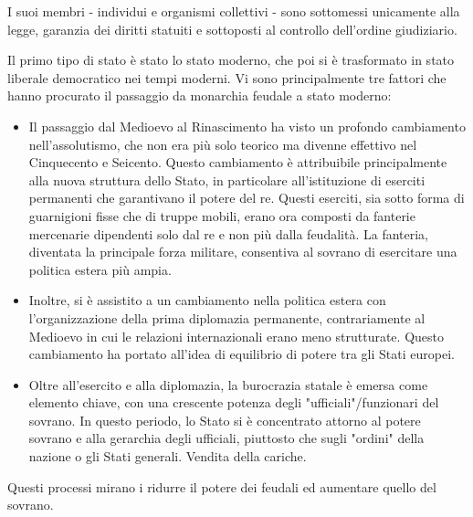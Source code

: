 \documentclass[a4paper]{article}
\begin{document}

I suoi membri - individui e organismi collettivi - sono sottomessi unicamente alla legge,
garanzia dei diritti statuiti e sottoposti al controllo dell'ordine giudiziario.

Il primo tipo di stato è stato lo stato moderno, che poi si è trasformato in stato liberale democratico
nei tempi moderni.
Vi sono principalmente tre fattori che hanno procurato il passaggio da monarchia feudale a stato moderno:

\begin{itemize}
    \item
    Il passaggio dal Medioevo al Rinascimento ha visto un profondo cambiamento nell'assolutismo, che non era più solo teorico ma divenne effettivo nel Cinquecento e Seicento. Questo cambiamento è attribuibile principalmente alla nuova struttura dello Stato, in particolare all'istituzione di eserciti permanenti che garantivano il potere del re. Questi eserciti, sia sotto forma di guarnigioni fisse che di truppe mobili, erano ora composti da fanterie mercenarie dipendenti solo dal re e non più dalla feudalità. La fanteria, diventata la principale forza militare, consentiva al sovrano di esercitare una politica estera più ampia.
    \item
    Inoltre, si è assistito a un cambiamento nella politica estera con l'organizzazione della prima diplomazia permanente, contrariamente al Medioevo in cui le relazioni internazionali erano meno strutturate. Questo cambiamento ha portato all'idea di equilibrio di potere tra gli Stati europei.
    \item
    Oltre all'esercito e alla diplomazia, la burocrazia statale è emersa come elemento chiave, con una crescente potenza degli "ufficiali"/funzionari del sovrano. In questo periodo, lo Stato si è concentrato attorno al potere sovrano e alla gerarchia degli ufficiali, piuttosto che sugli "ordini" della nazione o gli Stati generali.
    Vendita della cariche.
\end{itemize}

Questi processi mirano i ridurre il potere dei feudali ed aumentare quello del sovrano.
\end{document}
